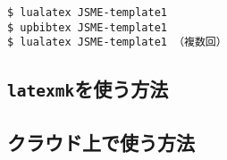 \begin{tcolorbox}[enhanced, title=\LuaLaTeX$+$\upBibTeX, drop fuzzy shadow]
\begin{verbatim}
$ lualatex JSME-template1
$ upbibtex JSME-template1
$ lualatex JSME-template1 （複数回）
\end{verbatim}
\end{tcolorbox}


\subsection{\texttt{latexmk}を使う方法}
\label{ssec:latexmk}

\lipsum[1-8]

\subsection{クラウド上で使う方法}
\label{ssec:cloud}


\lipsum[1-4]

